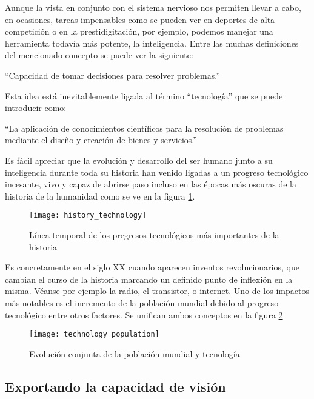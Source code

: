 Aunque la vista en conjunto con el sistema nervioso nos permiten llevar a cabo, en ocasiones, tareas impensables como se pueden ver en deportes de alta competición o en la prestidigitación, por ejemplo, podemos manejar una herramienta todavía más potente, la inteligencia. Entre las muchas definiciones del mencionado concepto se puede ver la siguiente:

``Capacidad de tomar decisiones para resolver problemas.''


Esta idea está inevitablemente ligada al término ``tecnología'' que se puede introducir como:

``La aplicación de conocimientos científicos para la resolución de problemas mediante el diseño y creación de bienes y servicios.''

Es fácil apreciar que la evolución y desarrollo del ser humano junto a su inteligencia durante toda su historia han venido ligadas a un progreso tecnológico\cite{historia_tecnologia} incesante, vivo y capaz de abrirse paso incluso en las épocas más oscuras de la historia de la humanidad como se ve en la figura \ref{fig:history_technology}.

\begin{figure}[!htb]
\centering
{}
  \texttt{[image: history\_technology]}
  \caption{Línea temporal de los pregresos tecnológicos más importantes de la historia}\label{fig:history_technology}
\endminipage\hfill
\end{figure}

Es concretamente en el siglo XX cuando aparecen inventos revolucionarios, que cambian el curso de la historia marcando un definido punto de inflexión en la misma. Véanse por ejemplo la radio, el transistor, o internet. Uno de los impactos más notables es el incremento de la población mundial debido al progreso tecnológico entre otros factores. Se unifican ambos conceptos en la figura \ref{fig:technology_population}

\begin{figure}[!htb]
\centering
{}
  \texttt{[image: technology\_population]}
  \caption{Evolución conjunta de la población mundial y tecnología}\label{fig:technology_population}
\endminipage\hfill
\end{figure}

\fi


\subsection{Exportando la capacidad de visión}

